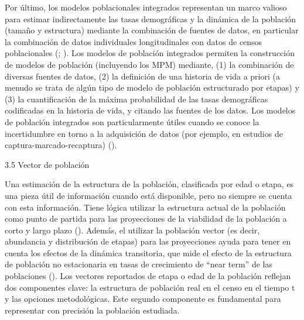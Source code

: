 \documentclass[
]{book}
\theoremstyle{definition}
\theoremstyle{definition}
\theoremstyle{definition}
\theoremstyle{definition}
\theoremstyle{remark}
\begin{document}
Por último, los modelos poblacionales integrados representan un marco valioso para estimar indirectamente las tasas demográficas y la dinámica de la población (tamaño y estructura) mediante la combinación de fuentes de datos, en particular la combinación de datos individuales longitudinales con datos de censos poblacionales (\citet{plard2019integrated}; \citet{schaub2021integrated}). Los modelos de población integrados permiten la construcción de modelos de población (incluyendo los MPM) mediante, (1) la combinación de diversas fuentes de datos, (2) la definición de una historia de vida a priori (a menudo se trata de algún tipo de modelo de población estructurado por etapas) y (3) la cuantificación de la máxima probabilidad de las tasas demográficas codificadas en la historia de vida, y citando las fuentes de los datos. Los modelos de población integrados son particularmente útiles cuando se conoce la incertidumbre en torno a la adquisición de datos (por ejemplo, en estudios de captura-marcado-recaptura) (\citet{riecke2019integrated}).

3.5 \textbar{} Vector de población

Una estimación de la estructura de la población, clasificada por edad o etapa, es una pieza útil de información cuando está disponible, pero no siempre se cuenta con esta información. Tiene lógica utilizar la estructura actual de la población como punto de partida para las proyecciones de la viabilidad de la población a corto y largo plazo (\citet{werner2019savanna}). Además, el utilizar la población vector (es decir, abundancia y distribución de etapas) para las proyecciones ayuda para tener en cuenta los efectos de la dinámica transitoria, que mide el efecto de la estructura de población no estacionaria en tasas de crecimiento de ``near term'' de las poblaciones (\citet{capdevila2020towards}). Los vectores reportados de etapa o edad de la población reflejan dos componentes clave: la estructura de población real en el censo en el tiempo t y las opciones metodológicas. Este segundo componente es fundamental para representar con precisión la población estudiada.
\end{document}
